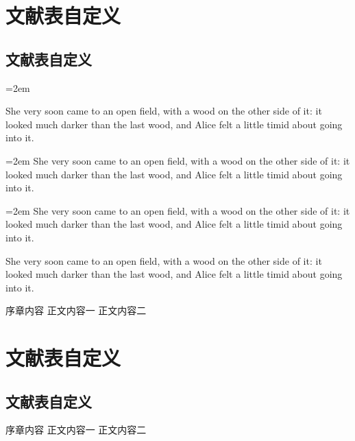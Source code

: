 \documentclass[twoside]{report}
\begin{document}
\chapter{文献表自定义}
\begin{refsection}
\section{文献表自定义}

{\hangindent=2em \par She very soon came to an open field, with
a wood on the other side of it: it looked much darker
than the last wood, and Alice felt a little timid
about going into it.\par}

{\hangindent=2em She very soon came to an open field, with
a wood on the other side of it: it looked much darker
than the last wood, and Alice felt a little timid
about going into it.\par}

{\hangindent=2em She very soon came to an open field, with
a wood on the other side of it: it looked much darker
than the last wood, and Alice felt a little timid
about going into it.}

 She very soon came to an open field, with
a wood on the other side of it: it looked much darker
than the last wood, and Alice felt a little timid
about going into it.

序章内容\cite{GPS1988--,杨洪升2013-56-75,马克思2013-302-302}
正文内容一\cite{Andersen1995-42-49,BUSECK1980-117-211,Calkin2011-8-9}
正文内容二\cite{Parsons2000b--,Parsons2000--,Parsons2000noloc--,Parsons2000nodate--}
\cite{1977-49-49,亚洲地质图编目组1978-194-208,陈晋镳1980-56-114}



\printbibliography[heading=subbibintoc,env=envtest,title=【参考文献】]
\end{refsection}

\chapter{文献表自定义}
\begin{refsection}
\section{文献表自定义}

序章内容\cite{GPS1988--,杨洪升2013-56-75,马克思2013-302-302}
正文内容一\cite{Andersen1995-42-49,BUSECK1980-117-211,Calkin2011-8-9}
正文内容二\cite{Parsons2000b--,Parsons2000--,Parsons2000noloc--,Parsons2000nodate--}
\cite{1977-49-49,亚洲地质图编目组1978-194-208,陈晋镳1980-56-114}

\printbibliography[heading=subbibintoc,env=marginref,title=【参考文献】]
\end{refsection}
\end{document}
